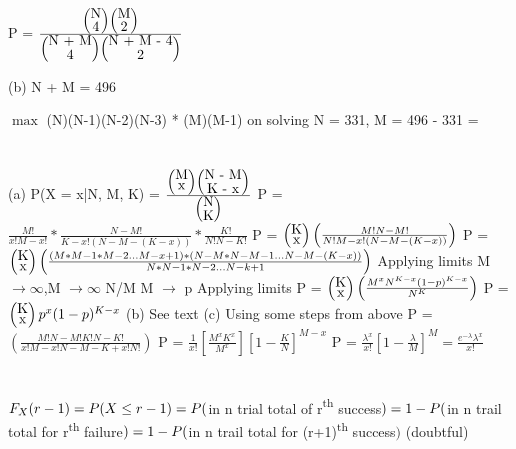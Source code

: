 \documentclass{report}
\begin{document}
P = $\frac{\left(\stackanchor{N}{4}\right)\left(\stackanchor{M}{2}\right)}{\left(\stackanchor{N + M}{4}\right)\left(\stackanchor{N + M - 4}{2}\right)}$

(b) N + M = 496
\newline

$\max$ (N)(N-1)(N-2)(N-3) * (M)(M-1)
on solving N = 331, M = 496 - 331 = 
\newline

\section{}
(a) P(X = x|N, M, K) = $\frac{\left(\stackanchor{M}{x}\right)\left(\stackanchor{N - M}{K - x}\right)}{\left(\stackanchor{N}{K}\right)}$
\newline
P = $\frac{M!}{x!M-x!} * \frac{N-M!}{K-x!(N - M - (K - x))} * \frac{K!}{N!N-K!}$
P = $\left(\stackanchor{K}{x}\right)\left(\frac{M!N-M!}{N!M-x!(N-M - (K - x))}\right)$
\newline
P = $\left(\stackanchor{K}{x}\right)\left(\frac{(M * M-1 * M-2 ... M-x+1) * (N - M * N - M -1  ... N - M - (K - x))}{N * N - 1 * N - 2 ... N - k + 1}\right)$
\newline
Applying limits M $\rightarrow \infty$,M $\rightarrow \infty$ N/M M $\rightarrow$ p
\newline
Applying limits
\newline
P = $\left(\stackanchor{K}{x}\right)\left(\frac{M^{x}N^{K - x}(1 - p)^{K - x}}{N^{K}}\right)$
\newline
P = $\left(\stackanchor{K}{x}\right)p^x(1 - p)^{K - x}$
\newline
(b) See text
{\newline}
(c) Using some steps from above
\newline
P = $\left(\frac{M!N-M!K!N-K!}{x!M-x!N-M-K+x!N!}\right)$
\newline
P = $\frac{1}{x!}\left[\frac{M^xK^x}{M^x}\right]\left[1 - \frac{K}{N}\right]^{M-x}$
\newline
P = $\frac{\lambda^x}{x!}\left[1 - \frac{\lambda}{M}\right]^{M} = \frac{e^{-\lambda}\lambda^x}{x!}$
\newline

\section{}
$F_X(r - 1) = P(X \le r - 1) \newline = P($in n trial total of r{\textsuperscript{th}} success$) \newline = 1 - P($in n trail total for r\textsuperscript{th} failure$) \newline = 1 - P($in n trail total for (r+1)\textsuperscript{th} success$)$ (doubtful)
\end{document}
